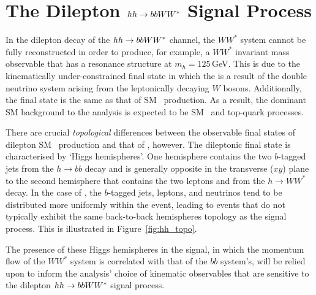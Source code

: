 \section{The Dilepton $hh \rightarrow bbWW^*$ Signal Process}
\label{sec:hh_pheno}

In the dilepton decay of the $hh \rightarrow bbWW^*$ channel, the $WW^*$ system
cannot be fully reconstructed in order to produce, for example, a $WW^*$ invariant
mass observable that has a resonance structure at $m_h = 125$\,GeV.
This is due to the
kinematically under-constrained final state in which the \met is a result of the double neutrino system
arising from the leptonically decaying $W$ bosons.
Additionally, the final state is the same as that of SM \ttbar~production.
As a result, the dominant SM background to the analysis is expected to be SM \ttbar~and top-quark processes.

There are crucial \textit{topological} differences between the observable final states of dilepton SM \ttbar~production and
that of \bbww, however.
The dileptonic \bbww final state is characterised by `Higgs hemispheres'.
One hemisphere contains the two $b$-tagged jets from the $h \rightarrow bb$ decay and is generally
opposite in the transverse ($xy$) plane to the second hemisphere that contains the two leptons
and \met from the $h \rightarrow WW^*$ decay.
In the case of \ttbar, the $b$-tagged jets, leptons, and neutrinos tend to be distributed more uniformly
within the event, leading to events that do not typically exhibit the same back-to-back hemispheres
topology as the \bbww signal process.
This is illustrated in Figure~\ref{fig:hh_topo}.

The presence of these Higgs hemispheres in the signal, in which the momentum flow of the $WW^*$ system
is correlated with that of the $bb$ system's, will be relied upon to inform the analysis' choice
of kinematic observables that are sensitive to the dilepton $hh \rightarrow bbWW^*$ signal process.


